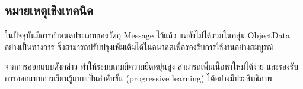 \subsection{หมายเหตุเชิงเทคนิค}

ในปัจจุบันมีการกำหนดประเภทของวัตถุ Message ไว้แล้ว แต่ยังไม่ได้รวมในกลุ่ม ObjectData อย่างเป็นทางการ ซึ่งสามารถปรับปรุงเพิ่มเติมได้ในอนาคตเพื่อรองรับการใช้งานอย่างสมบูรณ์

จากการออกแบบดังกล่าว ทำให้ระบบเกมมีความยืดหยุ่นสูง สามารถเพิ่มเนื้อหาใหม่ได้ง่าย และรองรับการออกแบบการเรียนรู้แบบเป็นลำดับขั้น (progressive learning) ได้อย่างมีประสิทธิภาพ

